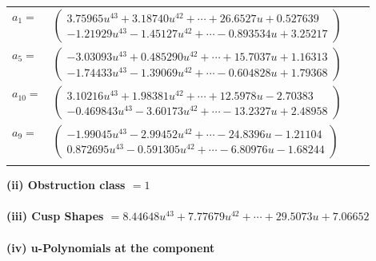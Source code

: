 \documentclass[1p]{elsarticle_modified}
\theoremstyle{definition}
\begin{document}
\begin{tabular}{m{7pt} m{180pt} m{7pt} m{180pt} }
\flushright $a_{1}=$&$\begin{pmatrix}3.75965 u^{43}+3.18740 u^{42}+\cdots+26.6527 u+0.527639\\-1.21929 u^{43}-1.45127 u^{42}+\cdots-0.893534 u+3.25217\end{pmatrix}$ \\
\flushright $a_{5}=$&$\begin{pmatrix}-3.03093 u^{43}+0.485290 u^{42}+\cdots+15.7037 u+1.16313\\-1.74433 u^{43}-1.39069 u^{42}+\cdots-0.604828 u+1.79368\end{pmatrix}$ \\
\flushright $a_{10}=$&$\begin{pmatrix}3.10216 u^{43}+1.98381 u^{42}+\cdots+12.5978 u-2.70383\\-0.469843 u^{43}-3.60173 u^{42}+\cdots-13.2327 u+2.48958\end{pmatrix}$ \\
\flushright $a_{9}=$&$\begin{pmatrix}-1.99045 u^{43}-2.99452 u^{42}+\cdots-24.8396 u-1.21104\\0.872695 u^{43}-0.591305 u^{42}+\cdots-6.80976 u-1.68244\end{pmatrix}$\\&\end{tabular}
\flushleft \textbf{(ii) Obstruction class $= 1$}\\~\\
\flushleft \textbf{(iii) Cusp Shapes $= 8.44648 u^{43}+7.77679 u^{42}+\cdots+29.5073 u+7.06652$}\\~\\
\newpage\renewcommand{\arraystretch}{1}
\flushleft \textbf{(iv) u-Polynomials at the component}\newline \\
\end{document}

